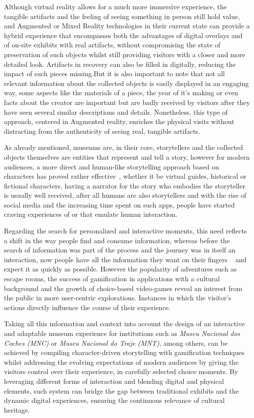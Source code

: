 Although virtual reality allows for a much more immersive experience, the tangible artifacts and the feeling of seeing something in person still hold value,
and Augmented or Mixed Reality technologies in their current state can provide a hybrid experience that encompasses both the advantages of digital overlays
and of on-site exhibits with real artifacts, without compromising the state of preservation of such objects whilst still providing visitors with a closer
and more detailed look. Artifacts in recovery can also be filled in digitally, reducing the impact of such pieces missing.But it is also important to note
that not all relevant information about the collected objects is easily displayed in an engaging way, some aspects like the materials of a piece,
the year of it's making or even facts about the creator are important but are badly received by visitors after they have seen several similar 
descriptions and details. Nonetheless, this type of approach, centered in Augmented reality, enriches the physical visits without distracting from
the authenticity of seeing real, tangible artifacts. 

As already mentioned, museums are, in their core, storytellers and the collected objects themselves are entities that represent and tell a story,
however for modern audiences, a more direct and human-like storytelling approach based on characters has proved rather effective~\cite{bekele_survey_2018},
whether it be virtual guides, historical or fictional characters, having a narrator for the story who embodies the storyteller is usually well received,
after all humans are also storytellers and with the rise of social media and the increasing time spent on such apps, people have started craving 
experiences of or that emulate human interaction.

Regarding the search for personalized and interactive moments, this need reflects a shift in the way people find and consume information,
whereas before the search of information was part of the process and the journey was in itself an interaction, now people have all the information they want
on their fingers ~\cite{wyman_digital_2011} and expect it as quickly as possible. However the popularity of adventures such as escape rooms, the success of 
gamification in applications with a cultural background and the growth of choice-based video-games reveal an interest from the public in more user-centric
explorations. Instances in which the visitor's actions directly influence the course of their experience.

Taking all this information and context into account the design of an interactive and adaptable museum experience for institutions such as \textit{Museu Nacional dos Coches (MNC)} 
or \textit{Museu Nacional do Traje (MNT)}, among others, can be achieved by compiling character-driven storytelling with gamification techniques
whilst addressing the evolving expectations of modern audiences by giving the visitors control over their experience, in carefully selected choice moments.
By leveraging different forms of interaction and blending digital and physical elements, such system can bridge the gap between traditional exhibits and the dynamic digital experiences, ensuring
the continuous relevance of cultural heritage. 

